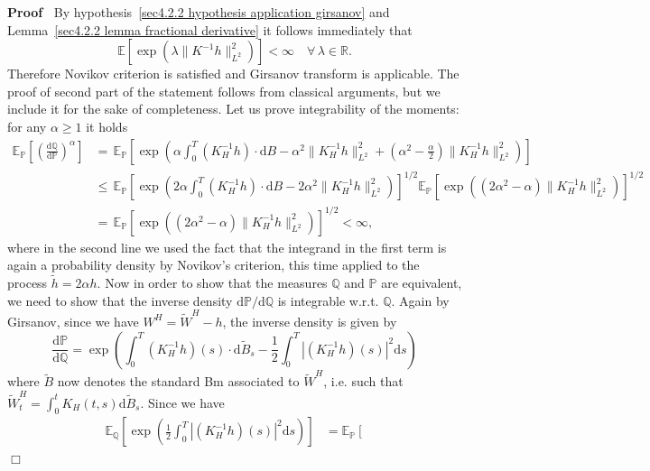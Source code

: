 \documentclass[10pt]{article}
\newcommand{\mathd}{\mathrm{d}}
\newenvironment{proof}{\noindent\textbf{Proof\ }}{\hspace*{\fill}$\Box$\medskip}
\begin{document}
\begin{proof}
  By hypothesis~{\eqref{sec4.2.2 hypothesis application girsanov}} and
  Lemma~\ref{sec4.2.2 lemma fractional derivative} it follows immediately that
  \[ \mathbb{E} [\exp (\lambda \| K^{- 1} h \|_{L^2}^2)] < \infty \quad
     \forall \, \lambda \in \mathbb{R}. \]
  Therefore Novikov criterion is satisfied and Girsanov transform is
  applicable. The proof of second part of the statement follows from classical
  arguments, but we include it for the sake of completeness. Let us prove
  integrability of the moments: for any $\alpha \geqslant 1$ it holds
%  
  \begin{align*}
    \mathbb{E}_{\mathbb{P}} \left[ \left( \frac{\mathd \mathbb{Q}}{\mathd
    \mathbb{P}} \right)^{\alpha} \right] & = \, \mathbb{E}_{\mathbb{P}} \left[
    \exp \left( \alpha \int_0^T (K^{- 1}_H h) \cdot \mathd B - \alpha^2 \|
    K^{- 1}_H h \|_{L^2}^2 + \left( \alpha^2 - \frac{\alpha}{2} \right)  \|
    K^{- 1}_H h \|_{L^2}^2 \right) \right]\\
    & \leqslant \, \mathbb{E}_{\mathbb{P}} \left[ \exp \left( 2 \alpha
    \int_0^T (K^{- 1}_H h) \cdot \mathd B - 2 \alpha^2  \| K^{- 1}_H h
    \|_{L^2}^2 \right) \right]^{1 / 2} \mathbb{E}_{\mathbb{P}} [\exp ((2
    \alpha^2 - \alpha) \| K^{- 1}_H h \|_{L^2}^2)]^{1 / 2}\\
    & = \, \mathbb{E}_{\mathbb{P}} [\exp ((2 \alpha^2 - \alpha) \| K^{- 1}_H
    h \|_{L^2}^2)]^{1 / 2} < \infty,
  \end{align*}
%  
  where in the second line we used the fact that the integrand in the first
  term is again a probability density by Novikov's criterion, this time
  applied to the process $\tilde{h} = 2 \alpha h$. Now in order to show that
  the measures $\mathbb{Q}$ and $\mathbb{P}$ are equivalent, we need to show
  that the inverse density $\mathd \mathbb{P}/ \mathd \mathbb{Q}$ is
  integrable w.r.t. $\mathbb{Q}$. Again by Girsanov, since we have $W^H =
  \tilde{W}^H - h$, the inverse density is given by
  \[ \frac{\mathd \mathbb{P}}{\mathd \mathbb{Q}} = \exp \left( \int_0^T (K^{-
     1}_H h) (s) \cdot \mathd \tilde{B}_s - \frac{1}{2} \int_0^T | (K^{- 1}_H
     h) (s) |^2 \mathd s \right) \]
  where $\tilde{B}$ now denotes the standard Bm associated to $\tilde{W}^H$,
  i.e. such that $\tilde{W}^H_t = \int^t_0 K_H (t, s) \mathd \tilde{B}_s$.
  Since we have
%  
  \begin{align*}
    \mathbb{E}_{\mathbb{Q}} \left[ \exp \left( \frac{1}{2} \int_0^T | (K^{-
    1}_H h) (s) |^2 \mathd s \right) \right] & =\mathbb{E}_{\mathbb{P}} \left[

\end{align*}
\end{proof}
\end{document}

